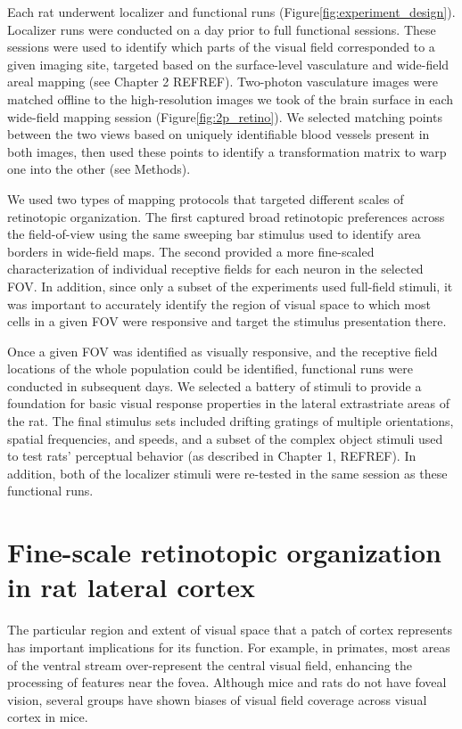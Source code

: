 Each rat underwent localizer and functional runs (Figure\ref{fig:experiment_design}). Localizer runs were conducted on a day prior to full functional sessions. These sessions were used to identify which parts of the visual field corresponded to a given imaging site, targeted based on the surface-level vasculature and wide-field areal mapping (see Chapter 2 REFREF). Two-photon vasculature images were matched offline to the high-resolution images we took of the brain surface in each wide-field mapping session (Figure\ref{fig:2p_retino}). We selected matching points between the two views based on uniquely identifiable blood vessels present in both images, then used these points to identify a transformation matrix to warp one into the other (see Methods).

We used two types of mapping protocols that targeted different scales of retinotopic organization. The first captured broad retinotopic preferences across the field-of-view using the same sweeping bar stimulus used to identify area borders in wide-field maps. The second provided a more fine-scaled characterization of individual receptive fields for each neuron in the selected FOV. In addition, since only a subset of the experiments used full-field stimuli, it was important to accurately identify the region of visual space to which most cells in a given FOV were responsive and target the stimulus presentation there. 

Once a given FOV was identified as visually responsive, and the receptive field locations of the whole population could be identified, functional runs were conducted in subsequent days. We selected a battery of stimuli to provide a foundation for basic visual response properties in the lateral extrastriate areas of the rat. The final stimulus sets included drifting gratings of multiple orientations, spatial frequencies, and speeds, and a subset of the complex object stimuli used to test rats' perceptual behavior (as described in Chapter 1, REFREF). In addition, both of the localizer stimuli were re-tested in the same session as these functional runs.

\section{Fine-scale retinotopic organization in rat lateral cortex}
The particular region and extent of visual space that a patch of cortex represents has important implications for its function. For example, in primates, most areas of the ventral stream over-represent the central visual field, enhancing the processing of features near the fovea\cite{REFREF, Gattass2005CorticalDynamics}. Although mice and rats do not have foveal vision, several groups have shown biases of visual field coverage across visual cortex in mice\cite{Garrett2014, Marshel2011, REFREF}. 

